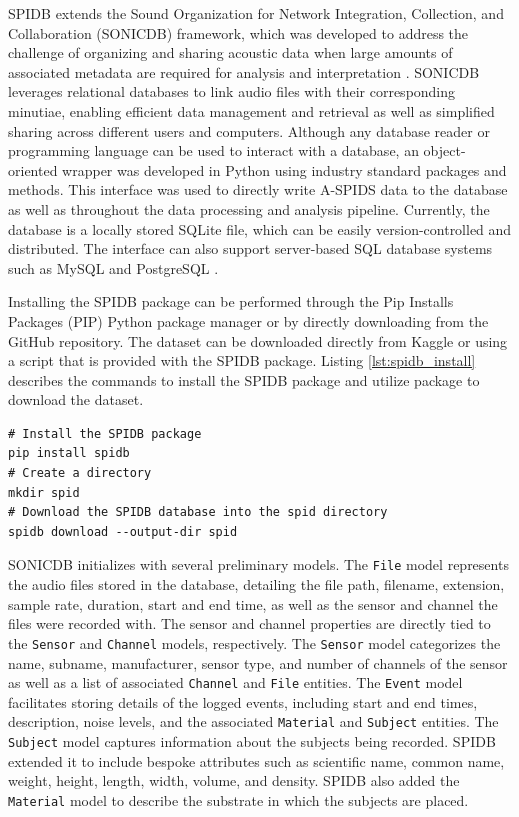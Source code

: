 \documentclass[../Vibro-Acoustic Signatures and Detection Algorithms for Stored Product Insects.tex]{subfiles}
\begin{document}
\newpage
SPIDB extends the Sound Organization for Network Integration, Collection, and Collaboration (SONICDB) framework, which was developed to address the challenge of organizing and sharing acoustic data when large amounts of associated metadata are required for analysis and interpretation \cite{rochManagementAcousticMetadata2016}. SONICDB leverages relational databases to link audio files with their corresponding minutiae, enabling efficient data management and retrieval as well as simplified sharing across different users and computers. Although any database reader or programming language can be used to interact with a database, an object-oriented wrapper was developed in Python using industry standard packages and methods. This interface was used to directly write A-SPIDS data to the database as well as throughout the data processing and analysis pipeline. Currently, the database is a locally stored SQLite file, which can be easily version-controlled and distributed. The interface can also support server-based SQL database systems such as MySQL and PostgreSQL \cite{danielkadyrovDkadyrovSonicdbV0122025}.

Installing the SPIDB package can be performed through the Pip Installs Packages (PIP) Python package manager or by directly downloading from the GitHub repository. The dataset can be downloaded directly from Kaggle or using a script that is provided with the SPIDB package. Listing \ref{lst:spidb_install} describes the commands to install the SPIDB package and utilize package to download the dataset.

\begin{listing}[htbp]
	\caption{Installing SPIDB package and downloading the database \label{lst:spidb_install}}
	\begin{verbatim}
# Install the SPIDB package
pip install spidb 
# Create a directory 
mkdir spid 
# Download the SPIDB database into the spid directory
spidb download --output-dir spid 
	\end{verbatim}
\end{listing}

SONICDB initializes with several preliminary models. The \texttt{File} model represents the audio files stored in the database, detailing the file path, filename, extension, sample rate, duration, start and end time, as well as the sensor and channel the files were recorded with. The sensor and channel properties are directly tied to the \texttt{Sensor} and \texttt{Channel} models, respectively. The \texttt{Sensor} model categorizes the name, subname, manufacturer, sensor type, and number of channels of the sensor as well as a list of associated \texttt{Channel} and \texttt{File} entities. The \texttt{Event} model facilitates storing details of the logged events, including start and end times, description, noise levels, and the associated \texttt{Material} and \texttt{Subject} entities. The \texttt{Subject} model captures information about the subjects being recorded. SPIDB extended it to include bespoke attributes such as scientific name, common name, weight, height, length, width, volume, and density. SPIDB also added the \texttt{Material} model to describe the substrate in which the subjects are placed.
\end{document}
